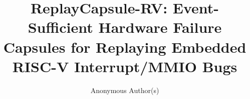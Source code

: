 \documentclass[sigconf,anonymous]{acmart}
\begin{document}
\title{ReplayCapsule-RV: Event-Sufficient Hardware Failure Capsules for Replaying Embedded RISC-V Interrupt/MMIO Bugs}

\author{Anonymous Author(s)}




\maketitle











\clearpage
{}
\label{aspdac:references-start}


\end{document}
